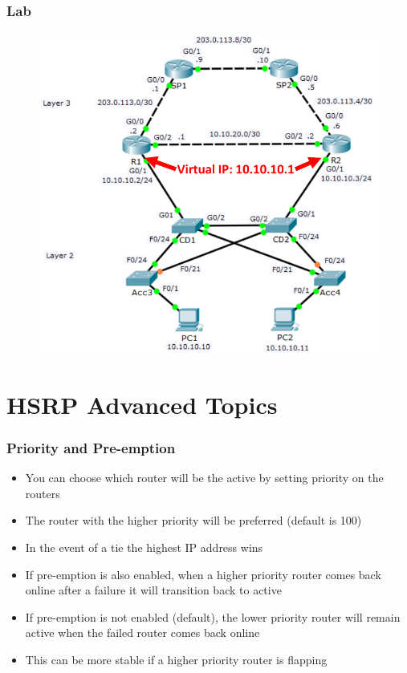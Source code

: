 \documentclass[pdflatex,compress,mathserif]{beamer}
\begin{document}
\begin{frame}
	\frametitle{Lab}
	\begin{figure}
		\centering
		\includegraphics[height=0.8\textheight]{img/img14}
	\end{figure}
\end{frame}

\section{HSRP Advanced Topics}

\begin{frame}
	\frametitle{Priority and Pre-emption}
	\begin{itemize}
		\item You can choose which router will be the active by setting priority on the
routers
		\item The router with the higher priority will be preferred (default is 100)
		\item In the event of a tie the highest IP address wins
		\item If pre-emption is also enabled, when a higher priority router comes back
online after a failure it will transition back to active
		\item If pre-emption is not enabled (default), the lower priority router will
remain active when the failed router comes back online
		\item This can be more stable if a higher priority router is flapping
	\end{itemize}
\end{frame}
\end{document}

